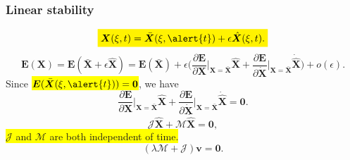 \documentclass{beamer}
\begin{document}


\begin{frame}
	\frametitle{Linear stability}
	\begin{overlayarea}{\textwidth}{\textheight}\vspace{-0.3cm}
		\begin{equation*}
			\colorbox{yellow}{$\bm{X}(\xi,t)=\bar{\bm{X}}(\xi,\alert{t})+\epsilon \hat{\bm{X}}(\xi,t)$.}
		\end{equation*}
		\begin{equation*}
			\bm{E}(\bm{X})=\bm{E}(\bar{\bm{X}}+\epsilon \hat{\bm{X}})=\bm{E}(\bar{\bm{X}})+\epsilon \Big(\frac{\partial \bm{E}}{\partial \bm{X}}\Big|_{\bm{X}=\bar{\bm{X}}}\hat{\bm{X}}+\frac{\partial \bm{E}}{\partial \dot{\bm{X}}}\Big|_{\bm{X}=\bar{\bm{X}}}\dot{\hat{\bm{X}}}\Big)+o(\epsilon).
		\end{equation*}
		Since \colorbox{yellow}{$\bm{E}(\bar{\bm{X}}(\xi,\alert{t}))=\bm{0}$}, we have 
		\begin{equation*}
			\frac{\partial \bm{E}}{\partial \bm{X}}\Big|_{\bm{X}=\bar{\bm{X}}}\hat{\bm{X}}+\frac{\partial \bm{E}}{\partial \dot{\bm{X}}}\Big|_{\bm{X}=\bar{\bm{X}}}\dot{\hat{\bm{X}}}=\bm{0}.
		\end{equation*}
		\begin{equation*}
			\bm{\mathcal{J}}\hat{\bm{X}}+\bm{\mathcal{M}}\dot{\hat{\bm{X}}}=\bm{0},
		\end{equation*}
		\colorbox{yellow}{$\bm{\mathcal{J}}$ and $\bm{\mathcal{M}}$ are both independent of time.}
		\begin{equation*}
			(\lambda\bm{\mathcal{M}}+\bm{\mathcal{J}})\bm{v}=\bm{0}.
		\end{equation*}
	\end{overlayarea}
\end{frame}


\frame[plain]{\frametitle{Results: effect of increasing $\mathcal{I}$}
	\begin{overlayarea}{\textwidth}{\textheight}\vspace{-0.3cm}
		\foreach \index in {1,...,1} %
	{\pgfmathsetmacro\picnumber{int(\index+13)}	
		\only<\index>{%
			\begin{center}	
				\includegraphics<\index>[width=0.9\textwidth]{plots/combine_elastic_beam_I_theta_q_0.40_alpha_0.230pi_initial_-4.80_\picnumber.png}	
			\end{center}              	
		\vspace{-0.3cm}
	}
}
\end{overlayarea}
}
\end{document}
